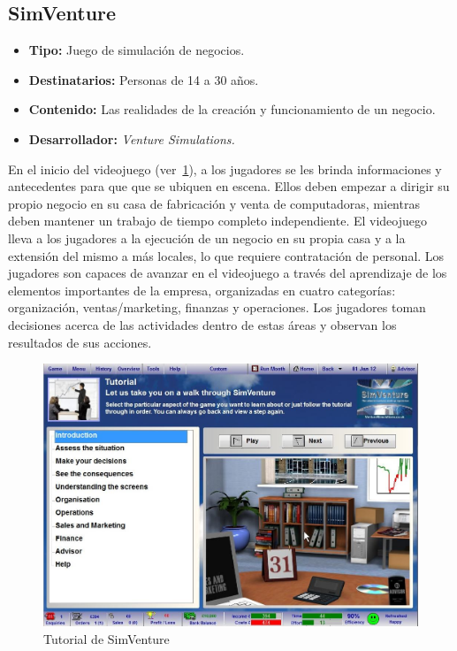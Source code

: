 \subsection{SimVenture}

\begin{itemize}
\item \textbf{Tipo:} Juego de simulación de negocios.
\item \textbf{Destinatarios:} Personas de 14 a 30 años.
\item \textbf{Contenido:} Las realidades de la creación y funcionamiento de un
    negocio.
\item \textbf{Desarrollador:} \emph{Venture Simulations.}
\end{itemize}

En el inicio del videojuego (ver~\ref{fig:simventure_tutorial}), a los jugadores se
les brinda informaciones y antecedentes para que que se ubiquen en escena. Ellos
deben empezar a dirigir su propio negocio en su casa de fabricación y venta de
computadoras, mientras deben mantener un trabajo de tiempo completo
independiente. El videojuego lleva a los jugadores a la ejecución de un negocio en su
propia casa y a la extensión del mismo a más locales, lo que requiere
contratación de personal. Los jugadores son capaces de avanzar en el videojuego a
través del aprendizaje de los elementos importantes de la empresa, organizadas
en cuatro categorías: organización, ventas/marketing, finanzas y operaciones.
Los jugadores toman decisiones acerca de las actividades dentro de estas áreas y
observan los resultados de sus acciones. 

\begin{figure}[ht!]
\centering 
\includegraphics[scale=0.5]{tics/images/simventure-tutorial.jpg}
\caption{Tutorial de SimVenture}
\label{fig:simventure_tutorial}
\end{figure}

